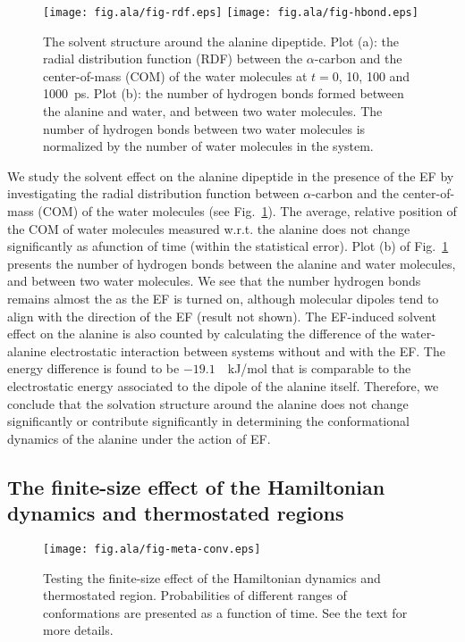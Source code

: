 \documentclass[a4paper,preprint,unsortedaddress,onecolumn]{revtex4-1}
\begin{document}
\begin{figure}
  \centering
  \texttt{[image: fig.ala/fig-rdf.eps]}
  \texttt{[image: fig.ala/fig-hbond.eps]}
  \caption{The solvent structure around the alanine dipeptide.  Plot
    (a): the radial distribution function (RDF) between the
    $\alpha$-carbon and the center-of-mass (COM) of the water molecules at
    $t = 0$, 10, 100 and 1000~ps.  Plot (b): the number of hydrogen
    bonds formed between the alanine and water, and between two water
    molecules.  The number of hydrogen bonds between two water
    molecules is normalized by the number of water molecules in the
    system.}
  \label{fig:tmp7a}
\end{figure}
We study the solvent effect on the alanine dipeptide in the presence of the EF by investigating
the radial distribution function between $\alpha$-carbon and the
center-of-mass (COM) of the water molecules
(see Fig.~\ref{fig:tmp7a}). The average, relative position of the COM of water molecules measured w.r.t.
 the alanine does not change significantly as afunction of time (within the statistical error). Plot (b) of
Fig.~\ref{fig:tmp7a} presents the number of hydrogen bonds between the
alanine and water molecules, and between two water molecules. We see that the
number hydrogen bonds remains almost the as the EF is turned on,
although molecular dipoles tend to align with the direction of the EF (result
not shown). 
The EF-induced solvent effect on the alanine is also counted by calculating the
difference of the water-alanine electrostatic interaction 
between systems without and with the EF.
The energy difference is found to be $-19.1$~~kJ/mol that is
comparable to the electrostatic energy associated to the dipole of the alanine itself.
Therefore, we conclude that the solvation structure around the
alanine does not change significantly or contribute significantly in determining the conformational dynamics of the alanine under the action of EF.






\subsection{The finite-size effect of the Hamiltonian dynamics and thermostated regions}

\begin{figure}
  \centering
  \texttt{[image: fig.ala/fig-meta-conv.eps]}
  \caption{Testing the finite-size effect of the Hamiltonian dynamics and thermostated region.
    Probabilities of different ranges of conformations are presented as a function of time.
    See the text for more details.
  }
  \label{fig:tmp7}
\end{figure}
\end{document}
